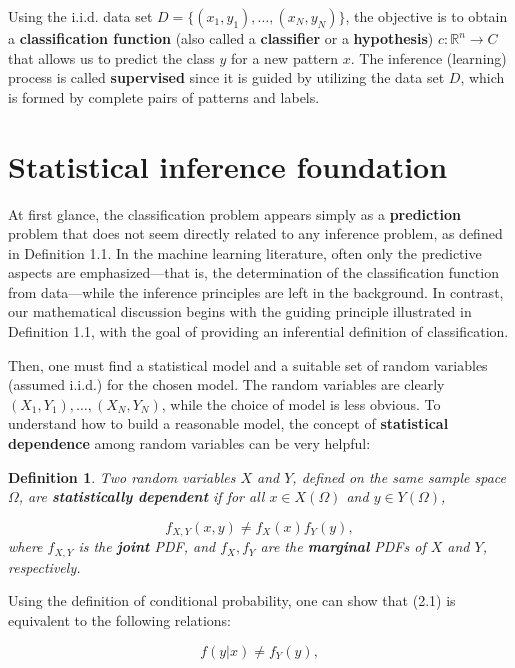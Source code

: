 \documentclass{report}
\newtheorem{definition}{Definition}[chapter]
\begin{document}
Using the i.i.d. data set $D = \{(x_1,y_1),\dots,(x_N,y_N)\}$, the objective is to obtain a \textbf{classification function} (also called a \textbf{classifier} or a \textbf{hypothesis}) $c : \mathbb{R}^n \to C$ that allows us to predict the class $y$ for a new pattern $x$. The inference (learning) process is called \textbf{supervised} since it is guided by utilizing the data set $D$, which is formed by complete pairs of patterns and labels.

\section{Statistical inference foundation}
At first glance, the classification problem appears simply as a \textbf{prediction} problem that does not seem directly related to any inference problem, as defined in Definition 1.1. In the machine learning literature, often only the predictive aspects are emphasized—that is, the determination of the classification function from data—while the inference principles are left in the background. In contrast, our mathematical discussion begins with the guiding principle illustrated in Definition 1.1, with the goal of providing an inferential definition of classification.

Then, one must find a statistical model and a suitable set of random variables (assumed i.i.d.) for the chosen model. The random variables are clearly $(X_1,Y_1),\dots,(X_N,Y_N)$, while the choice of model is less obvious. To understand how to build a reasonable model, the concept of \textbf{statistical dependence} among random variables can be very helpful:

\begin{definition}
Two random variables $X$ and $Y$, defined on the same sample space $\Omega$, are \textbf{statistically dependent} if for all $x\in X(\Omega)$ and $y \in Y(\Omega)$,

\begin{equation}
f_{X,Y}(x,y) \neq f_X(x)f_Y(y),
\end{equation}
where $f_{X,Y}$ is the \textbf{joint} PDF, and $f_X,f_Y$ are the \textbf{marginal} PDFs of $X$ and $Y$, respectively.
\end{definition}
Using the definition of conditional probability, one can show that (2.1) is equivalent to the following relations:

\begin{equation}
f(y|x) \neq f_Y(y),
\end{equation}
\end{document}
